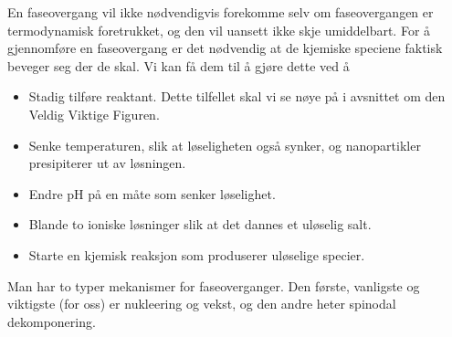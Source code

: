 En faseovergang vil ikke nødvendigvis forekomme selv om faseovergangen er termodynamisk foretrukket, og den vil uansett ikke skje umiddelbart. For å gjennomføre en faseovergang er det nødvendig at de kjemiske speciene faktisk beveger seg der de skal. Vi kan få dem til å gjøre dette ved å
\begin{itemize}
	\item Stadig tilføre reaktant. Dette tilfellet skal vi se nøye på i avsnittet om den Veldig Viktige Figuren.
	\item Senke temperaturen, slik at løseligheten også synker, og nanopartikler presipiterer ut av løsningen.
	\item Endre pH på en måte som senker løselighet.
	\item Blande to ioniske løsninger slik at det dannes et uløselig salt.
	\item Starte en kjemisk reaksjon som produserer uløselige specier.
\end{itemize}

Man har to typer mekanismer for faseoverganger. Den første, vanligste og viktigste (for oss) er nukleering og vekst, og den andre heter spinodal dekomponering.

